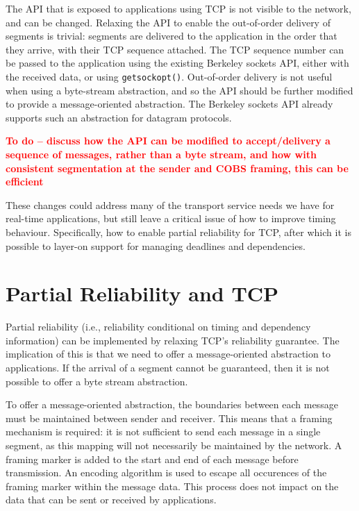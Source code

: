 \documentclass{sig-alternate-05-2015}
\newcommand{\todo}[1]{\textbf{\textcolor{red}{To do -- #1}}}
\begin{document}
The API that is exposed to applications using TCP is not visible to the
network, and can be changed. Relaxing the API to enable the out-of-order
delivery of segments is trivial: segments are delivered to the application
in the order that they arrive, with their TCP sequence attached. The TCP
sequence number can be passed to the application using the existing
Berkeley sockets API, either with the received data, or using 
\texttt{getsockopt()}. Out-of-order delivery is not useful when using a 
byte-stream abstraction, and so the API should be further modified to
provide a message-oriented abstraction. The Berkeley sockets API already
supports such an abstraction for datagram protocols.

\todo{discuss how the API can be modified to accept/delivery a sequence
      of messages, rather than a byte stream, and how with consistent
      segmentation at the sender and COBS framing, this can be efficient}

These changes could address many of the transport service needs we have for
real-time applications, but still leave a critical issue of how to improve
timing behaviour. Specifically, how to enable partial reliability for TCP,
after which it is possible to layer-on support for managing deadlines and 
dependencies.

\section{Partial Reliability and TCP}
\label{sec:partial}

Partial reliability (i.e., reliability conditional on timing and dependency
information) can be implemented by relaxing TCP's reliability guarantee.
The implication of this is that we need to offer a message-oriented
abstraction to applications. If the arrival of a segment cannot be
guaranteed, then it is not possible to offer a byte stream abstraction.

To offer a message-oriented abstraction, the boundaries between each
message must be maintained between sender and receiver. This means that a
framing mechanism is required: it is not sufficient to send each message in
a single segment, as this mapping will not necessarily be maintained by the
network. A framing marker is added to the start and end of each message
before transmission. An encoding algorithm is used to escape all occurences
of the framing marker within the message data. This process does not impact
on the data that can be sent or received by applications.
\end{document}
